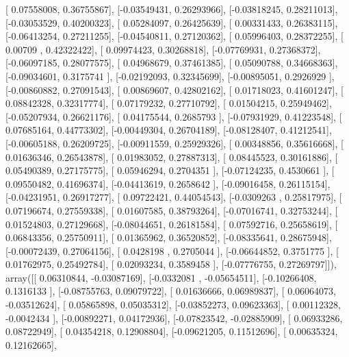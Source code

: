 \documentclass{article}
\begin{document}
       [ 0.07558008,  0.36755867],
       [-0.03549431,  0.26293966],
       [-0.03818245,  0.28211013],
       [-0.03053529,  0.40200323],
       [ 0.05284097,  0.26425639],
       [ 0.00331433,  0.26383115],
       [-0.06413254,  0.27211255],
       [-0.04540811,  0.27120362],
       [ 0.05996403,  0.28372255],
       [ 0.00709   ,  0.42322422],
       [ 0.09974423,  0.30268818],
       [-0.07769931,  0.27368372],
       [-0.06097185,  0.28077575],
       [ 0.04968679,  0.37461385],
       [ 0.05090788,  0.34668363],
       [-0.09034601,  0.3175741 ],
       [-0.02192093,  0.32345699],
       [-0.00895051,  0.2926929 ],
       [-0.00860882,  0.27091543],
       [ 0.00869607,  0.42802162],
       [ 0.01718023,  0.41601247],
       [ 0.08842328,  0.32317774],
       [ 0.07179232,  0.27710792],
       [ 0.01504215,  0.25949462],
       [-0.05207934,  0.26621176],
       [ 0.04175544,  0.2685793 ],
       [-0.07931929,  0.41223548],
       [ 0.07685164,  0.44773302],
       [-0.00449304,  0.26704189],
       [-0.08128407,  0.41212541],
       [-0.00605188,  0.26209725],
       [-0.00911559,  0.25929326],
       [ 0.00348856,  0.35616668],
       [ 0.01636346,  0.26543878],
       [ 0.01983052,  0.27887313],
       [ 0.08445523,  0.30161886],
       [ 0.05490389,  0.27175775],
       [ 0.05946294,  0.2704351 ],
       [-0.07124235,  0.4530661 ],
       [ 0.09550482,  0.41696374],
       [-0.04413619,  0.2658642 ],
       [-0.09016458,  0.26115154],
       [-0.04231951,  0.26917277],
       [ 0.09722421,  0.44054543],
       [-0.0309263 ,  0.25817975],
       [ 0.07196674,  0.27559338],
       [ 0.01607585,  0.38793264],
       [-0.07016741,  0.32753244],
       [ 0.01524803,  0.27129668],
       [-0.08044651,  0.26181584],
       [ 0.07592716,  0.25658619],
       [ 0.06843356,  0.25750911],
       [ 0.01365962,  0.36520852],
       [-0.08335641,  0.28675948],
       [-0.00072439,  0.27064156],
       [ 0.0428198 ,  0.2705044 ],
       [-0.06644852,  0.3751775 ],
       [ 0.01762975,  0.25492784],
       [ 0.02093234,  0.3589458 ],
       [-0.07776755,  0.27269797]]), array([[ 0.06310844, -0.03087169],
       [-0.0332081 , -0.05654511],
       [-0.10266408,  0.1316133 ],
       [-0.08755763,  0.09079722],
       [ 0.01636666,  0.06989837],
       [ 0.06064073, -0.03512624],
       [ 0.05865898,  0.05035312],
       [-0.03852273,  0.09623363],
       [ 0.00112328, -0.0042434 ],
       [-0.00892271,  0.04172936],
       [-0.07823542, -0.02885909],
       [ 0.06933286,  0.08722949],
       [ 0.04354218,  0.12908804],
       [-0.09621205,  0.11512696],
       [ 0.00635324,  0.12162665],
\end{document}
